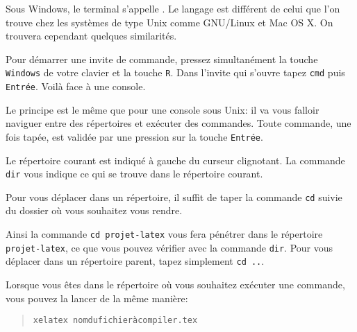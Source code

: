 Sous Windows, le terminal s'appelle . Le langage
est différent de celui que l'on trouve chez les systèmes de type Unix comme
GNU/Linux et Mac OS X. On trouvera cependant quelques similarités.

Pour démarrer une invite de commande, pressez simultanément la touche \verb|Windows| de votre
clavier et la touche \verb|R|. Dans l'invite qui s'ouvre tapez \verb|cmd| puis
\verb|Entrée|. Voilà face à une console.

Le principe est le même que pour une console sous Unix: il va vous falloir
naviguer entre des répertoires et exécuter des commandes. Toute commande, une
fois tapée, est validée par une pression sur la touche \verb|Entrée|.

Le répertoire courant est indiqué à gauche du curseur clignotant.
La commande \verb|dir| vous indique ce qui se trouve dans le répertoire
courant.

Pour vous déplacer dans un répertoire, il suffit de taper la commande
\verb|cd| suivie du dossier où vous souhaitez vous rendre.

Ainsi la commande \verb|cd projet-latex| vous fera pénétrer dans le
répertoire \verb|projet-latex|, ce que vous pouvez vérifier avec la
commande \verb|dir|. Pour vous déplacer dans un répertoire parent, tapez
simplement \verb|cd ..|.

Lorsque vous êtes dans le répertoire où vous souhaitez exécuter une
commande, vous pouvez la lancer de la même manière:

\begin{quote}
\verb|xelatex nomdufichieràcompiler.tex|
\end{quote}


